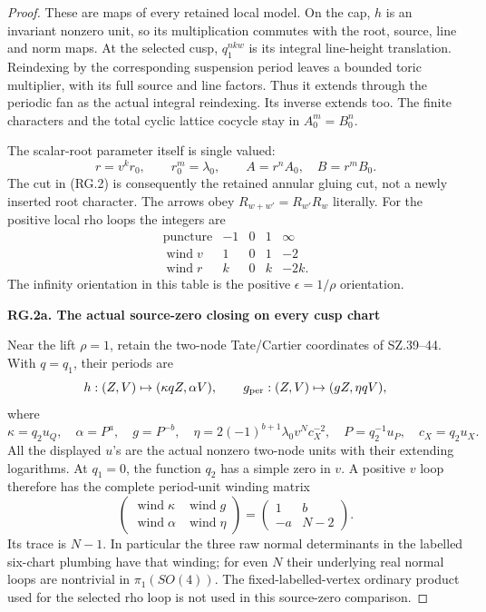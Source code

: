 \begin{proof}
These are maps of every retained local model. On the cap, \(h\)
is an invariant nonzero unit, so its multiplication commutes
with the root, source, line and norm maps. At the selected cusp,
\(q_1^{nkw}\) is its integral line-height translation. Reindexing
by the corresponding suspension period leaves a bounded toric
multiplier, with its full source and line factors. Thus it
extends through the periodic fan as the actual integral
reindexing. Its inverse extends too. The finite characters and
the total cyclic lattice cocycle stay in \(A_0^m=B_0^n\).

The scalar-root parameter itself is single valued:
\[
 r=v^k r_0,\qquad r_0^m=\lambda_0,\qquad
 A=r^nA_0,\quad B=r^mB_0.
\]
The cut in (RG.2) is consequently the retained annular gluing
cut, not a newly inserted root character. The arrows obey
\(R_{w+w'}=R_{w'}R_w\) literally. For the positive local rho
loops the integers are
\[
 \begin{array}{c|rrrr}
 \text{puncture}&-1&0&1&\infty\\ \hline
 \operatorname{wind}v&1&0&1&-2\\
 \operatorname{wind}r&k&0&k&-2k .
 \end{array}                                           \tag{RG.4}
\]
The infinity orientation in this table is the positive
\(\epsilon=1/\rho\) orientation.

\par

\medskip\noindent\textbf{RG.2a. The actual source-zero closing on every cusp chart}

\par\nobreak

Near the lift \(\rho=1\), retain the two-node Tate/Cartier
coordinates of SZ.39--44. With \(q=q_1\), their periods are
\[
 h:(Z,V)\mapsto(\kappa qZ,\alpha V),\qquad
 g_{\rm per}:(Z,V)\mapsto(gZ,\eta qV),
\]
where
\[
 \kappa=q_2u_Q,\quad \alpha=P^a,\quad
 g=P^{-b},\quad
 \eta=2(-1)^{b+1}\lambda_0v^Nc_X^{-2},\quad
 P=q_2^{-1}u_P,\quad c_X=q_2u_X.
                                                        \tag{RG.4a}
\]
All the displayed \(u\)'s are the actual nonzero two-node
units with their extending logarithms. At \(q_1=0\), the
function \(q_2\) has a simple zero in \(v\). A positive \(v\)
loop therefore has the complete period-unit winding matrix
\[
 \begin{pmatrix}
  \operatorname{wind}\kappa&\operatorname{wind}g\\
  \operatorname{wind}\alpha&\operatorname{wind}\eta
 \end{pmatrix}
 =
 \begin{pmatrix}1&b\\-a&N-2\end{pmatrix}.              \tag{RG.4b}
\]
Its trace is \(N-1\). In particular the three raw normal
determinants in the labelled six-chart plumbing have that
winding; for even \(N\) their underlying real normal loops
are nontrivial in \(\pi_1(SO(4))\). The fixed-labelled-vertex
ordinary product used for the selected rho loop is not used
in this source-zero comparison.


\end{proof}
